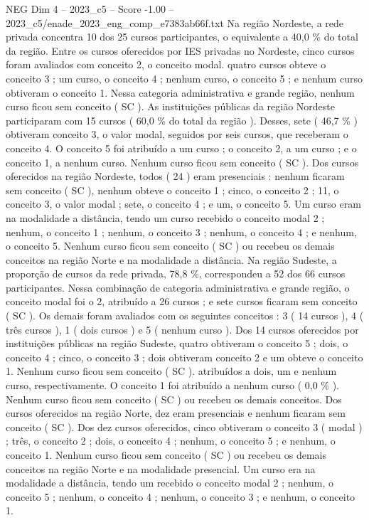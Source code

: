 \begin{textsample}{NEG Dim 4 – 2023\_c5 – Score -1.00 – 2023\_c5/enade\_2023\_eng\_comp\_e7383ab66f.txt}
Na região Nordeste, a rede privada concentra 10 dos 25 cursos participantes, o equivalente a 40,0 \% do total da região.
Entre os cursos oferecidos por IES privadas no Nordeste, cinco cursos foram avaliados com conceito 2, o conceito modal. quatro cursos obteve o conceito 3 ; um curso, o conceito 4 ; nenhum curso, o conceito 5 ; e nenhum curso obtiveram o conceito 1.
Nessa categoria administrativa e grande região, nenhum curso ficou sem conceito ( SC ).
As instituições públicas da região Nordeste participaram com 15 cursos ( 60,0 \% do total da região ).
Desses, sete ( 46,7 \% ) obtiveram conceito 3, o valor modal, seguidos por seis cursos, que receberam o conceito 4.
O conceito 5 foi atribuído a um curso ; o conceito 2, a um curso ; e o conceito 1, a nenhum curso.
Nenhum curso ficou sem conceito ( SC ).
Dos cursos oferecidos na região Nordeste, todos ( 24 ) eram presenciais : nenhum ficaram sem conceito ( SC ), nenhum obteve o conceito 1 ; cinco, o conceito 2 ; 11, o conceito 3, o valor modal ; sete, o conceito 4 ; e um, o conceito 5.
Um curso eram na modalidade a distância, tendo um curso recebido o conceito modal 2 ; nenhum, o conceito 1 ; nenhum, o conceito 3 ; nenhum, o conceito 4 ; e nenhum, o conceito 5.
Nenhum curso ficou sem conceito ( SC ) ou recebeu os demais conceitos na região Norte e na modalidade a distância.
Na região Sudeste, a proporção de cursos da rede privada, 78,8 \%, correspondeu a 52 dos 66 cursos participantes.
Nessa combinação de categoria administrativa e grande região, o conceito modal foi o 2, atribuído a 26 cursos ; e sete cursos ficaram sem conceito ( SC ).
Os demais foram avaliados com os seguintes conceitos : 3 ( 14 cursos ), 4 ( três cursos ), 1 ( dois cursos ) e 5 ( nenhum curso ).
Dos 14 cursos oferecidos por instituições públicas na região Sudeste, quatro obtiveram o conceito 5 ; dois, o conceito 4 ; cinco, o conceito 3 ; dois obtiveram conceito 2 e um obteve o conceito 1.
Nenhum curso ficou sem conceito ( SC ). atribuídos a dois, um e nenhum curso, respectivamente.
O conceito 1 foi atribuído a nenhum curso ( 0,0 \% ).
Nenhum curso ficou sem conceito ( SC ) ou recebeu os demais conceitos.
Dos cursos oferecidos na região Norte, dez eram presenciais e nenhum ficaram sem conceito ( SC ).
Dos dez cursos oferecidos, cinco obtiveram o conceito 3 ( modal ) ; três, o conceito 2 ; dois, o conceito 4 ; nenhum, o conceito 5 ; e nenhum, o conceito 1.
Nenhum curso ficou sem conceito ( SC ) ou recebeu os demais conceitos na região Norte e na modalidade presencial.
Um curso era na modalidade a distância, tendo um recebido o conceito modal 2 ; nenhum, o conceito 5 ; nenhum, o conceito 4 ; nenhum, o conceito 3 ; e nenhum, o conceito 1.

\end{textsample}
